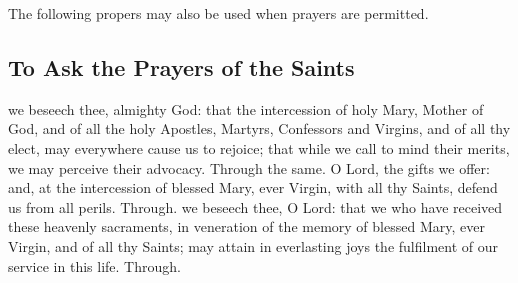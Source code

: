 \clearpage
\begin{rubric}
    The following propers may also be used when  prayers are permitted.
\end{rubric}
\vspace{-1ex}
\begin{multicols}{2}
\subsection{To Ask the Prayers of the Saints}
\collect
{} we beseech thee, almighty God: that the intercession of holy Mary, Mother of God, and of all the holy Apostles, Martyrs, Confessors and Virgins, and of all thy elect, may everywhere cause us to rejoice; that while we call to mind their merits, we may perceive their advocacy. Through the same.
\secret
{} O Lord, the gifts we offer: and, at the intercession of blessed Mary, ever Virgin, with all thy Saints, defend us from all perils. Through.
\postcommunion
{} we beseech thee, O Lord: that we who have received these heavenly sacraments, in veneration of the memory of blessed Mary, ever Virgin, and of all thy Saints; may attain in everlasting joys the fulfilment of our service in this life. Through.

%

   \newcolumn


\end{multicols}
